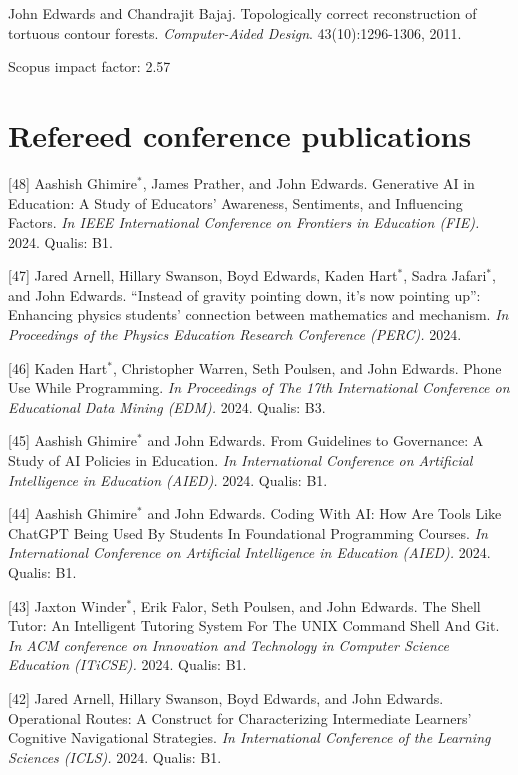 \documentclass[margin,line]{res}
\newcommand{\pubunder}[1]{#1}
\newcommand{\jnum}[1]{[#1]}
\newcommand{\cnum}[1]{[#1]}
\begin{document}
\begin{resume}
\jnum{1} \protect \pubunder{John Edwards} and Chandrajit Bajaj. Topologically correct reconstruction of tortuous contour forests. \textit{Computer-Aided Design}. 43(10):1296-1306, 2011.
\begin{IMPACT}
Scopus impact factor: 2.57 %
\end{IMPACT}


\section{\sc Refereed conference publications}
\cnum{48} Aashish Ghimire$^*$, James Prather, and John Edwards. Generative AI in Education: A Study of Educators’ Awareness, Sentiments, and Influencing Factors. \textit{In IEEE International Conference on Frontiers in Education (FIE).} 2024. Qualis: B1.

\cnum{47} Jared Arnell, Hillary Swanson, Boyd Edwards, Kaden Hart$^*$, Sadra Jafari$^*$, and John Edwards. ``Instead of gravity pointing down, it’s now pointing up'': Enhancing physics students' connection between mathematics and mechanism. \textit{In Proceedings of the Physics Education Research Conference (PERC).} 2024.

\cnum{46} Kaden Hart$^*$, Christopher Warren, Seth Poulsen, and John Edwards. Phone Use While Programming. \textit{In Proceedings of The 17th International Conference on Educational Data Mining (EDM).} 2024. Qualis: B3.

\cnum{45} Aashish Ghimire$^*$ and John Edwards. From Guidelines to Governance: A Study of AI Policies in Education. \textit{In International Conference on Artificial Intelligence in Education (AIED).} 2024. Qualis: B1.

\cnum{44} Aashish Ghimire$^*$ and John Edwards. Coding With AI: How Are Tools Like ChatGPT Being Used By Students In Foundational Programming Courses. \textit{In International Conference on Artificial Intelligence in Education (AIED).} 2024. Qualis: B1.

\cnum{43} Jaxton Winder$^*$, Erik Falor, Seth Poulsen, and John Edwards. The Shell Tutor: An Intelligent Tutoring System For The UNIX Command Shell And Git. \textit{In ACM conference on Innovation and Technology in Computer Science Education (ITiCSE).} 2024. Qualis: B1.

\cnum{42} Jared Arnell, Hillary Swanson, Boyd Edwards, and John Edwards. Operational Routes: A Construct for Characterizing Intermediate Learners’ Cognitive Navigational Strategies. \textit{In International Conference of the Learning Sciences (ICLS).} 2024. Qualis: B1.


\end{resume}
\end{document}
